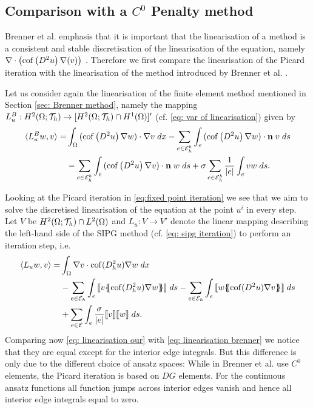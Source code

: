 \subsection{Comparison with a $C^0$ Penalty method}\label{subsec: comparison brenner}
Brenner et al. emphasis that it is important that the linearisation of a \MA method is a consistent and stable discretisation of the linearisation of the \MA equation, namely $\nabla \cdot \left( \operatorname{cof} \left( D^2 u  \right) \nabla (v) \right)$ \cite[Remark 2.2]{BGN+2011}.
Therefore we first compare the linearisation of the Picard iteration with the linearisation of the method introduced by Brenner et al. \cite{BGN+2011}.

Let us consider again the linearisation of the finite element method mentioned in Section \ref{sec: Brenner method}, namely the mapping $L^B_u:H^2(\Omega; \mathcal{T}_h) \rightarrow [H^2(\Omega; \mathcal{T}_h) \cap H^1(\Omega)]'$ (cf. \eqref{eq: var of linearisation}) given by
\begin{align}
 \langle L^B_{u} w, v \rangle
	=&\int_{\Omega} {{ (\operatorname{cof} \left( D^2  u \right)\nabla w) \cdot \nabla v}\;dx}
		- \sum_{e \in \mathcal{E}_h^b} \int_{e} {{ (\operatorname{cof} \left( D^2 u \right)\nabla w) \cdot \mathbf n \; v}\;ds} \nonumber \\
		&-  \sum_{e \in \mathcal{E}_h^b} \int_{e} {{ (\operatorname{cof} \left( D^2 u \right)\nabla v) \cdot \mathbf n \; w}\;ds} 
		+ \sigma \sum_{e \in \mathcal{E}_h^b} \frac 1 {|e|} \int_{e} {{ v w}\;ds}.
		\label{eq: linearisation brenner}
\end{align}


Looking at the Picard iteration in \eqref{eq:fixed point iteration} we see that we aim to solve the discretised linearisation of the \MA equation at the point $u^i$ in every step.\\
Let $V$ be $H^2(\Omega; \mathcal{T}_h) \cap L^2(\Omega)$ and $L_u: V \rightarrow V'$ denote the linear mapping describing the left-hand side of the SIPG method (cf. \eqref{eq: sipg iteration}) to perform an iteration step, i.e.
\begin{align}
	\bilin {L_u w} v =
 &\myIntX  \Omega { \nabla v \cdot \cof(D_h^2 u) \nabla w } \nonumber\\
 & -\sum\limits_{e \in \edges}\myIntS e { \jump {v \average { \cof(D_h^2 u) \nabla w} }}
 - \sum\limits_{e \in \edges}\myIntS e { \jump {w \average{ \cof(D^2 u) \nabla v} }} \nonumber\\  
 & +\sum\limits_{e \in \bigEps} \myIntS e { \frac \sigma {|e|} \jump {v}  \jump {w}}. \label{eq: linearisation our}
\end{align}
Comparing now \eqref{eq: linearisation our} with \eqref{eq: linearisation brenner} we notice that they are equal except for the interior edge integrals. But this difference is only due to the different choice of ansatz spaces: While in \cite{BGN+2011} Brenner et al. use $C^0$ elements, the Picard iteration is based on $DG$ elements. For the continuous ansatz functions all function jumps across interior edges vanish and hence all interior edge integrals equal to zero.


